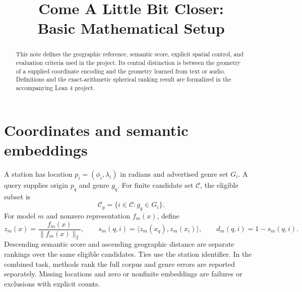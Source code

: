 \documentclass[10pt]{article}
\title{Come A Little Bit Closer:\\Basic Mathematical Setup}
\begin{document}
\maketitle

\begin{abstract}
This note defines the geographic reference, semantic score, explicit spatial control, and evaluation criteria used in the project. Its central distinction is between the geometry of a supplied coordinate encoding and the geometry learned from text or audio. Definitions and the exact-arithmetic spherical ranking result are formalized in the accompanying Lean 4 project.
\end{abstract}

\section{Coordinates and semantic embeddings}
A station has location $p_i=(\phi_i,\lambda_i)$ in radians and advertised genre set $G_i$. A query supplies origin $p_q$ and genre $g_q$. For finite candidate set $\mathcal C$, the eligible subset is
\begin{equation}
\mathcal C_g=\{i\in\mathcal C:g_q\in G_i\}.
\end{equation}
For model $m$ and nonzero representation $f_m(x)$, define
\begin{equation}
z_m(x)=\frac{f_m(x)}{\lVert f_m(x)\rVert_2},\qquad
s_m(q,i)=\langle z_m(x_q),z_m(x_i)\rangle,\qquad d_m(q,i)=1-s_m(q,i).
\end{equation}
Descending semantic score and ascending geographic distance are separate rankings over the same eligible candidates. Ties use the station identifier. In the combined task, methods rank the full corpus and genre errors are reported separately. Missing locations and zero or nonfinite embeddings are failures or exclusions with explicit counts.
\end{document}
